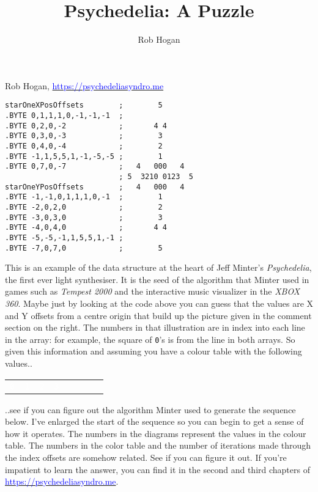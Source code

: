 \documentclass[pagedoutpaper,twocolumn,9pt]{pagedout}
\title{Psychedelia: A Puzzle}
\author{Rob Hogan}
\makeatletter
\newcommand*{\icode}[1]{{\texttt{#1}}}
\renewcommand{\maketitle}{
\begin{flushleft}
{\noindent\Huge\bf\@title}\break
\end{flushleft}
}
\makeatother
\begin{document}
    
\maketitle
\vspace{-0.8cm}
Rob Hogan, \href{https://psychedeliasyndro.me}{\textcolor{blue}{https://psychedeliasyndro.me}}
\begin{lstlisting}[basicstyle=\ttfamily\small]
starOneXPosOffsets        ;        5       
.BYTE 0,1,1,1,0,-1,-1,-1  ;                
.BYTE 0,2,0,-2            ;       4 4                                       
.BYTE 0,3,0,-3            ;        3                                        
.BYTE 0,4,0,-4            ;        2                                        
.BYTE -1,1,5,5,1,-1,-5,-5 ;        1       
.BYTE 0,7,0,-7            ;   4   000   4                                   
                          ; 5  3210 0123  5                  
starOneYPosOffsets        ;   4   000   4  
.BYTE -1,-1,0,1,1,1,0,-1  ;        1                                        
.BYTE -2,0,2,0            ;        2                                        
.BYTE -3,0,3,0            ;        3                                        
.BYTE -4,0,4,0            ;       4 4      
.BYTE -5,-5,-1,1,5,5,1,-1 ;                                                 
.BYTE -7,0,7,0            ;        5       
\end{lstlisting}   
This is an example of the data structure at the heart of Jeff Minter's \textit{Psychedelia}, the
first ever light synthesiser. It is the seed of the algorithm that Minter used in games such as
\textit{Tempest 2000} and the interactive music visualizer in the \textit{XBOX 360}. Maybe just
by looking at the code above you can guess that the values are X and Y offsets from a centre origin
that build up the picture given in the comment section on the right. The numbers in that illustration
are in index into each line in the array: for example, the square of \icode{0}'s is from the line in
both arrays. So given this information and assuming you have a colour table with the following values..
\begin{adjustbox}{width=5cm,center}
  \begin{tabular}{cccccccc}
    \cellcolor[HTML]{000000}\textcolor{white}{\icode{0}} & \cellcolor{c64_blue}\textcolor{white}{\icode{1}} &
    \cellcolor{c64_red}\textcolor{white}{\icode{2}} & \cellcolor{c64_purple}\textcolor{white}{\icode{3}} &
    \cellcolor{c64_green}\icode{4} & \cellcolor{c64_cyan}\icode{5} &
    \cellcolor{c64_yellow}\icode{6} & \cellcolor{c64_white}\icode{7}  \\
  \end{tabular}
\end{adjustbox}
..see if you can figure out the algorithm Minter used to generate the sequence below. I've enlarged the 
start of the sequence so you can begin to get a sense of how it operates. The numbers in the diagrams
represent the values in the colour table. The numbers in the color table and the number of iterations
made through the index offsets are somehow related. See if you can figure it out.
If you're impatient to learn the answer, you can find it in the second and third chapters of 
\href{https://psychedeliasyndro.me}{\textcolor{blue}{https://psychedeliasyndro.me}}.
\end{document}
